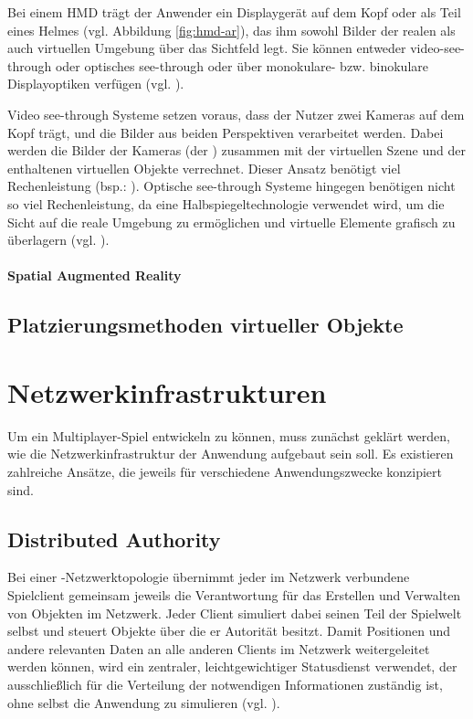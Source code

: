 Bei einem \ac{HMD} trägt der Anwender ein Displaygerät auf dem Kopf oder als Teil eines Helmes (vgl. Abbildung \ref{fig:hmd-ar}), das ihm sowohl Bilder der realen als auch virtuellen Umgebung über das Sichtfeld legt. Sie können entweder video-see-through oder optisches see-through oder über monokulare- bzw. binokulare Displayoptiken verfügen (vgl. \citealp[S. 346]{carmigniani_augmented_2011}).

Video see-through Systeme setzen voraus, dass der Nutzer zwei Kameras auf dem Kopf trägt, und die Bilder aus beiden Perspektiven verarbeitet werden. Dabei werden die Bilder der Kameras (der ) zusammen mit der virtuellen Szene und der enthaltenen virtuellen Objekte verrechnet. Dieser Ansatz benötigt viel Rechenleistung (bsp.: \cite{noauthor_vive_nodate}). Optische see-through Systeme hingegen benötigen nicht so viel Rechenleistung, da eine Halbspiegeltechnologie verwendet wird, um die Sicht auf die reale Umgebung zu ermöglichen und virtuelle Elemente grafisch zu überlagern (vgl. \citealp[S. 346f]{carmigniani_augmented_2011}).

\paragraph{Spatial Augmented Reality}


\subsection{Platzierungsmethoden virtueller Objekte}

\section{Netzwerkinfrastrukturen}\label{sec:basics-network-structures}
Um ein Multiplayer-Spiel entwickeln zu können, muss zunächst geklärt werden, wie die Netzwerkinfrastruktur der Anwendung aufgebaut sein soll. Es existieren zahlreiche Ansätze, die jeweils für verschiedene Anwendungszwecke konzipiert sind.

\subsection{Distributed Authority}
Bei einer -Netzwerktopologie übernimmt jeder im Netzwerk verbundene Spielclient gemeinsam jeweils die Verantwortung für das Erstellen und Verwalten von Objekten im Netzwerk. Jeder Client simuliert dabei seinen Teil der Spielwelt selbst und steuert Objekte über die er Autorität besitzt.
Damit Positionen und andere relevanten Daten an alle anderen Clients im Netzwerk weitergeleitet werden können, wird ein zentraler, leichtgewichtiger Statusdienst verwendet, der ausschließlich für die Verteilung der notwendigen Informationen zuständig ist, ohne selbst die Anwendung zu simulieren (vgl. \cite{noauthor_distributed_2025}).

